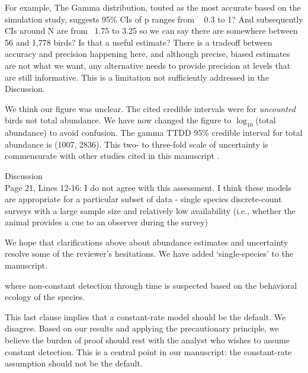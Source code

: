 \documentclass[12pt]{article}
\renewenvironment{quote}  %
              {\list{}{\rightmargin\leftmargin}\normalfont%
               \item\relax}
              {\endlist}
\begin{document}
For example, The Gamma distribution, touted as the most accurate based on the simulation study, suggests 95\% CIs of p ranges from ~ 0.3 to 1?  And subsequently CIs around N are from ~1.75 to 3.25 so we can say there are somewhere between 56 and 1,778  birds?
Is that a useful estimate?  There is a tradeoff between accuracy and precision happening here, and although precise, biased estimates are not what we want, any alternative needs to provide precision at levels that are still informative.  This is a limitation not sufficiently addressed in the Discussion.
\begin{quote} 
We think our figure was unclear.
The cited credible intervals were for \textit{uncounted} birds not total abundance.
We have now changed the figure to $\log_{10}$(total abundance) to avoid confusion.
The gamma TTDD 95\% credible interval for total abundance is (1007, 2836).
This two- to three-fold scale of uncertainty is commensurate with other studies cited in this manuscript \citep{Diefenbach2007, Reidy2011, Solymos2013, Amundson2014}.
\end{quote}

Discussion\\
Page 21, Lines 12-16:  I do not agree with this assessment.  I think these models are appropriate for a particular subset of data - single species discrete-count surveys with a large sample size and relatively low availability (i.e., whether the animal provides a cue to an observer during the survey)   
\begin{quote}
We hope that clarifications above about abundance estimates and uncertainty resolve some of the reviewer's hesitations.
We have added `single-species' to the manuscript.
\end{quote}

where non-constant detection through time is suspected based on the behavioral ecology of the species.

\begin{quote}
This last clause implies that a constant-rate model should be the default.
We disagree.
Based on our results and applying the precautionary principle, we believe the burden of proof should rest with the analyst who wishes to assume constant detection.
This is a central point in our manuscript: the constant-rate assumption should not be the default.
\end{quote}
\end{document}
